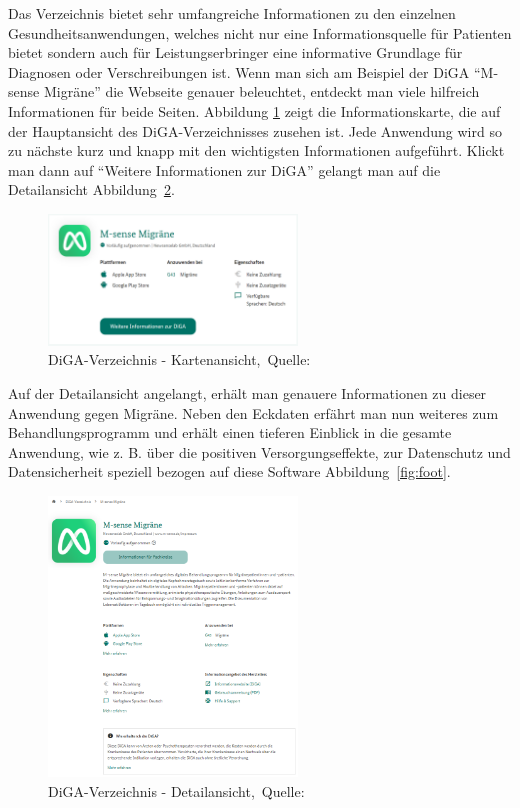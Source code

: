 Das Verzeichnis bietet sehr umfangreiche Informationen zu den einzelnen Gesundheitsanwendungen, welches nicht nur eine Informationsquelle für Patienten bietet sondern auch für Leistungserbringer eine informative Grundlage für Diagnosen oder Verschreibungen ist. Wenn man sich am Beispiel der DiGA ``M-sense Migräne'' die Webseite genauer beleuchtet, entdeckt man viele hilfreich Informationen für beide Seiten. Abbildung \ref{fig:mainTile} zeigt die Informationskarte, die auf der Hauptansicht des DiGA-Verzeichnisses zusehen ist. Jede Anwendung wird so zu nächste kurz und knapp mit den wichtigsten Informationen aufgeführt. Klickt man dann auf ``Weitere Informationen zur DiGA'' gelangt man auf die Detailansicht Abbildung~\ref{fig:detailView}.
\begin{figure}[H]
	\centering
	\includegraphics[width=250px, keepaspectratio]{assets/digaBSP1.png}
	\caption[DiGA-Verzeichnis - Kartenansicht]{DiGA-Verzeichnis - Kartenansicht,~Quelle:~\cite{digaverzeichnis}}
	\label{fig:mainTile}
\end{figure}
Auf der Detailansicht angelangt, erhält man genauere Informationen zu dieser Anwendung gegen Migräne. Neben den Eckdaten erfährt man nun weiteres zum Behandlungsprogramm und erhält einen tieferen Einblick in die gesamte Anwendung, wie z. B. über die positiven Versorgungseffekte, zur Datenschutz und Datensicherheit speziell bezogen auf diese Software Abbildung~\ref{fig:foot}.
\begin{figure}[H]
	\centering
	\includegraphics[width=250px]{assets/digaBSP2.png}
	\caption[DiGA-Verzeichnis - Detailansicht]{DiGA-Verzeichnis - Detailansicht,~Quelle:~\cite{digadetailansicht}}
	\label{fig:detailView}
\end{figure}

